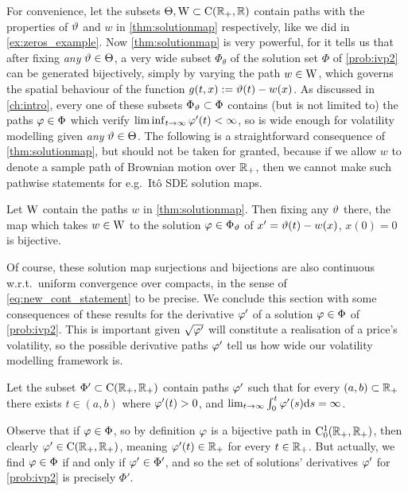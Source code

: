 For convenience, let the subsets $\Theta,\mathrm{W}\subset\mathrm{C}(\mathbb{R}_+,\mathbb{R})$ contain paths with the properties of $\vartheta$ and $w$ in \autoref{thm:solutionmap} respectively, like we did in \autoref{ex:zeros_example}. Now \autoref{thm:solutionmap} is very powerful, for it tells us that after fixing \emph{any} $\vartheta\in\Theta$, a very wide subset $\Phi_\theta$ of the solution set $\Phi$ of \autoref{prob:ivp2} can be generated bijectively, simply by varying the path $w\in\mathrm{W}$, which governs the spatial behaviour of the function $g(t,x):=\vartheta(t)-w(x)$. As discussed in \autoref{ch:intro}, every one of these subsets $\Phi_\vartheta\subset\Phi$ contains (but is not limited to) the paths $\varphi\in\Phi$ which verify $\liminf_{t\to\infty}\varphi'(t)<\infty$, so is wide enough for volatility modelling given \emph{any} $\vartheta\in\Theta$. The following is a straightforward consequence of \autoref{thm:solutionmap}, but should not be taken for granted, because if we allow $w$ to denote a sample path of Brownian motion over $\mathbb{R}_+$, then we cannot make such pathwise statements for e.g.~It\^o SDE solution maps.

\begin{corollary}\label{cor:bijec_2}
    Let $\mathrm{W}$ contain the paths $w$ in \autoref{thm:solutionmap}. Then fixing any $\vartheta$ there, the map which takes $w\in\mathrm{W}$ to the solution $\varphi\in\Phi_\vartheta$ of $x' = \vartheta(t)-w(x)$, $x(0)=0$ is bijective.
\end{corollary}

Of course, these solution map surjections and bijections are also continuous w.r.t.~uniform convergence over compacts, in the sense of \autoref{eq:new_cont_statement} to be precise. We conclude this section with some consequences of these results for the derivative $\varphi'$ of a solution $\varphi\in\Phi$ of \autoref{prob:ivp2}. This is important given $\sqrt{\varphi'}$ will constitute a realisation of a price's volatility, so the possible derivative paths $\varphi'$ tell us how wide our volatility modelling framework is.

\begin{definition}\label{def:solutionderivset}
    Let the subset $\Phi'\subset\mathrm{C}(\mathbb{R}_+,\mathbb{R}_+)$ contain paths $\varphi'$ such that for every $(a,b)\subset\mathbb{R}_+$ there exists $t\in(a,b)$ where $\varphi'(t)>0$, and $\lim_{t\to\infty}\int_0^t\varphi'(s)\mathrm{d} s = \infty$.
\end{definition}

Observe that if $\varphi\in\Phi$, so by definition $\varphi$ is a bijective path in $\mathrm{C}^1_0(\mathbb{R}_+,\mathbb{R}_+)$, then clearly $\varphi'\in\mathrm{C}(\mathbb{R}_+,\mathbb{R}_+)$, meaning $\varphi'(t)\in\mathbb{R}_+$ for every $t\in\mathbb{R}_+$. But actually, we find $\varphi\in\Phi$ if and only if $\varphi'\in\Phi'$, and so the set of solutions' derivatives $\varphi'$ for \autoref{prob:ivp2} is precisely $\Phi'$.

